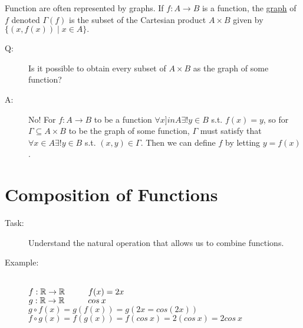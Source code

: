 \documentclass[10pt]{article}
\begin{document}
	Function are often represented by graphs. If $f:A \rightarrow B$ is a function, the \underline{graph} of $f$ denoted $\Gamma (f)$ is the subset of the Cartesian product $A \times B$ given by $\{(x, f(x)) \mid x \in A \}.$
	\begin{description}
		\item[Q:] Is it possible to obtain every subset of $A \times B$ as the graph of some function?
		\item[A:] No! For $f:A \rightarrow B$ to be a function $\forall x ]in A \exists! y \in B$ s.t. $f(x)=y$, so for $\Gamma \subseteq A \times B$ to be the graph of some function, $\Gamma$ must satisfy that $\forall x \in A \exists! y \in B$ s.t. $(x, y) \in \Gamma$. Then we can define $f$ by letting $y = f(x)$.
	\end{description}
	
	\section{Composition of Functions}
	\begin{description}
		\item[Task:] Understand the natural operation that allows us to combine functions.
		\begin{figure}[h]
			\centering
		\end{figure}
		\item[Example:] ~\\
		$f: \mathbb{R} \rightarrow \mathbb{R} \hspace{10mm} f(x) = 2x$ \\
		$g: \mathbb{R} \rightarrow \mathbb{R} \hspace{10mm} cos \: x$ \\
		$g \circ f(x) = g(f(x)) = g(2x = cos(2x))$ \\
		$f \circ g(x) = f(g(x)) = f(cos \: x) = 2(cos \: x) = 2 cos \: x$
	\end{description}
	
\end{document}
